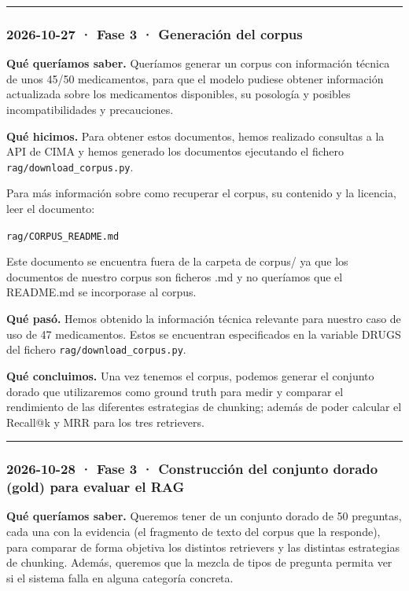 \begin{center}\rule{0.5\linewidth}{0.5pt}\end{center}

\subsubsection{2026-10-27 · Fase 3 · Generación del corpus}

\textbf{Qué queríamos saber.} Queríamos generar un corpus con información técnica de unos 45/50 medicamentos, para que el modelo pudiese obtener información actualizada sobre los medicamentos disponibles, su posología y posibles incompatibilidades y precauciones.

\textbf{Qué hicimos.} Para obtener estos documentos, hemos realizado consultas a la API de CIMA y hemos generado los documentos ejecutando el fichero \texttt{rag/\allowbreak{}download\_\allowbreak{}corpus.py}.

Para más información sobre como recuperar el corpus, su contenido y la licencia, leer el documento:

\texttt{rag/\allowbreak{}CORPUS\_\allowbreak{}README.md}

Este documento se encuentra fuera de la carpeta de corpus/ ya que los documentos de nuestro corpus son ficheros .md y no queríamos que el README.md se incorporase al corpus.

\textbf{Qué pasó.} Hemos obtenido la información técnica relevante para nuestro caso de uso de 47 medicamentos. Estos se encuentran especificados en la variable DRUGS del fichero \texttt{rag/\allowbreak{}download\_\allowbreak{}corpus.py}.

\textbf{Qué concluimos.} Una vez tenemos el corpus, podemos generar el conjunto dorado que utilizaremos como ground truth para medir y comparar el rendimiento de las diferentes estrategias de chunking; además de poder calcular el Recall@k y MRR para los tres retrievers.

\begin{center}\rule{0.5\linewidth}{0.5pt}\end{center}

\subsubsection{2026-10-28 · Fase 3 · Construcción del conjunto dorado (gold) para evaluar el RAG}

\textbf{Qué queríamos saber.} Queremos tener de un conjunto dorado de 50 preguntas, cada una con la evidencia (el fragmento de texto del corpus que la responde), para comparar de forma objetiva los distintos retrievers y las distintas estrategias de chunking. Además, queremos que la mezcla de tipos de pregunta permita ver si el sistema falla en alguna categoría concreta.

